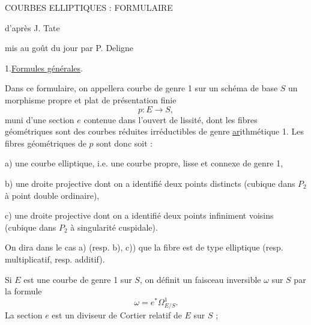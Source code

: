 
\begin{center}
COURBES ELLIPTIQUES : FORMULAIRE

 d'après J. Tate

mis au goût du jour par P. Deligne
\end{center}

1.\quad \uline{Formules générales}.

Dans ce formulaire, on appellera courbe de genre 1 sur un schéma de base $S$ un morphisme propre et plat de présentation finie
\[
p:E\longrightarrow S,
\]
muni d'une section $e$ contenue dans l'ouvert de lissité, dont les fibres géométriques sont des courbes réduites irréductibles de genre \uline{ar}ithmétique 1. Les fibres géométriques de $p$ sont donc soit :

 a) une courbe elliptique, i.e. une courbe propre, lisse et connexe de genre 1,

 b) une droite projective dont on a identifié deux points distincts (cubique dans $P_2$ à point double ordinaire),

 c) une droite projective dont on a identifié deux points infiniment voisins (cubique dans $P_2$ à singularité cuspidale).

On dira dans le cas a) (resp. b), c)) que la fibre est de type elliptique (resp. multiplicatif, resp. additif).

Si $E$ est une courbe de genre 1 sur $S$, on définit un faisceau inversible $\omega$ sur $S$ par la formule
\[
\omega=e^*\Omega^1_{E/S}.
\]
La section $e$ est un diviseur de Cortier relatif de $E$ sur $S$ ;
